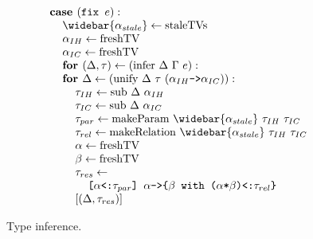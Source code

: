 \documentclass[acmsmall]{acmart}
\begin{document}
\begin{figure*}[h]
\[\begin{array}[t]{@{} l}
    \I \B{case } (\code{fix $e$}) :  
    \\
    \I\I \widebar{\alpha_{stale}} \leftarrow \F{staleTVs}
    \\
    \I\I \alpha_{IH} \leftarrow \F{freshTV}
    \\
    \I\I \alpha_{IC} \leftarrow \F{freshTV}
    \\
    \I\I \B{for } (\Delta, \tau) \leftarrow (\F{infer}\ \Delta\ \Gamma\ e):
    \\
    \I\I \B{for } \Delta \leftarrow (\F{unify}\ \Delta\ \tau\ (\code{$\alpha_{IH}$->$\alpha_{IC}$})): 
    \\
    \I\I\I \tau_{IH} \leftarrow \F{sub}\ \Delta\ \alpha_{IH}  
    \\
    \I\I\I \tau_{IC} \leftarrow \F{sub}\ \Delta\ \alpha_{IC}
    \\
    \I\I\I \tau_{par} \leftarrow \F{makeParam}\ \widebar{\alpha_{stale}}\ \tau_{IH}\ \tau_{IC}
    \\
    \I\I\I \tau_{rel} \leftarrow \F{makeRelation}\ \widebar{\alpha_{stale}}\ \tau_{IH}\ \tau_{IC}
    \\
    \I\I\I \alpha \leftarrow \F{freshTV}
    \\
    \I\I\I \beta \leftarrow \F{freshTV}
    \\
    \I\I\I \tau_{res} \leftarrow
    \\
    \I\I\I\I \code{[$\alpha$<:$\tau_{par}$] $\alpha$->\{$\beta$ with ($\alpha$*$\beta$)<:$\tau_{rel}$\}}
    \\
    \I\I\I [(\Delta, \tau_{res})]

\end{array}
\]
\caption{Type inference.}
\end{figure*}
\end{document}
